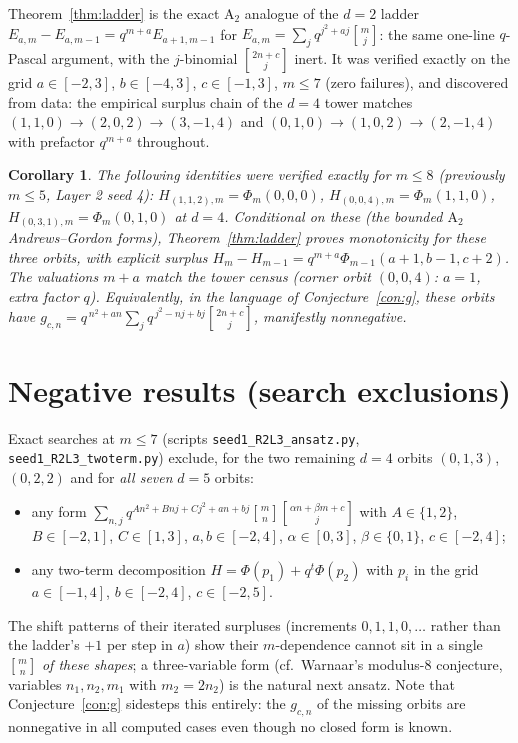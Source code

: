 \documentclass[11pt]{article}
\newtheorem{corollary}[theorem]{Corollary}
\newcommand{\qbin}[2]{\genfrac{[}{]}{0pt}{}{#1}{#2}}
\begin{document}
Theorem~\ref{thm:ladder} is the exact $\mathrm{A}_2$ analogue of the $d=2$
ladder $E_{a,m}-E_{a,m-1}=q^{m+a}E_{a+1,m-1}$ for
$E_{a,m}=\sum_j q^{j^2+aj}\qbin{m}{j}$: the same one-line $q$-Pascal
argument, with the $j$-binomial $\qbin{2n+c}{j}$ inert. It was verified
exactly on the grid $a\in[-2,3]$, $b\in[-4,3]$, $c\in[-1,3]$, $m\le 7$
(zero failures), and discovered from data: the empirical surplus chain of
the $d=4$ tower matches
$(1,1,0)\to(2,0,2)\to(3,-1,4)$ and $(0,1,0)\to(1,0,2)\to(2,-1,4)$ with
prefactor $q^{m+a}$ throughout.

\begin{corollary}\label{cor:d4}
The following identities were verified exactly for $m\le 8$
(previously $m\le5$, Layer 2 seed 4):
$H_{(1,1,2),m}=\Phi_m(0,0,0)$, $H_{(0,0,4),m}=\Phi_m(1,1,0)$,
$H_{(0,3,1),m}=\Phi_m(0,1,0)$ at $d=4$. Conditional on these (the bounded
$\mathrm{A}_2$ Andrews--Gordon forms), Theorem~\ref{thm:ladder} \emph{proves}
monotonicity for these three orbits, with explicit surplus
$H_m-H_{m-1}=q^{m+a}\Phi_{m-1}(a+1,b-1,c+2)$. The valuations $m+a$ match the
tower census (corner orbit $(0,0,4)$: $a=1$, extra factor $q$).
Equivalently, in the language of Conjecture~\ref{con:g}, these orbits have
$g_{c,n}=q^{\,n^2+an}\sum_j q^{\,j^2-nj+bj}\qbin{2n+c}{j}$, manifestly
nonnegative.
\end{corollary}

\section{Negative results (search exclusions)}

Exact searches at $m\le 7$ (scripts \texttt{seed1\_R2L3\_ansatz.py},
\texttt{seed1\_R2L3\_twoterm.py}) exclude, for the two remaining $d=4$
orbits $(0,1,3)$, $(0,2,2)$ and for \emph{all seven} $d=5$ orbits:
\begin{itemize}
\item any form $\sum_{n,j}q^{An^2+Bnj+Cj^2+an+bj}\qbin{m}{n}\qbin{\alpha
n+\beta m+c}{j}$ with $A\in\{1,2\}$, $B\in[-2,1]$, $C\in[1,3]$,
$a,b\in[-2,4]$, $\alpha\in[0,3]$, $\beta\in\{0,1\}$, $c\in[-2,4]$;
\item any two-term decomposition $H=\Phi(p_1)+q^t\Phi(p_2)$ with
$p_i$ in the grid $a\in[-1,4]$, $b\in[-2,4]$, $c\in[-2,5]$.
\end{itemize}
The shift patterns of their iterated surpluses (increments
$0,1,1,0,\dots$ rather than the ladder's $+1$ per step in $a$) show their
$m$-dependence cannot sit in a single $\qbin{m}{n}$ \emph{of these shapes};
a three-variable form (cf.\ Warnaar's modulus-8 conjecture, variables
$n_1,n_2,m_1$ with $m_2=2n_2$) is the natural next ansatz. Note that
Conjecture~\ref{con:g} sidesteps this entirely: the $g_{c,n}$ of the missing
orbits are nonnegative in all computed cases even though no closed form is
known.
\end{document}
